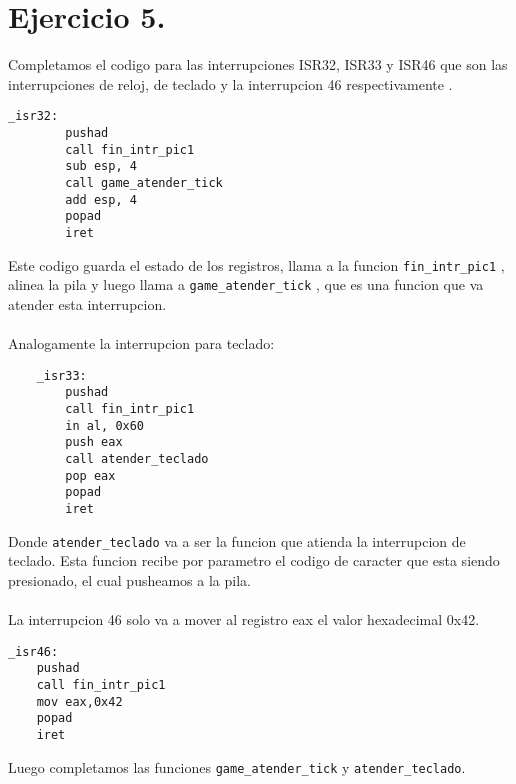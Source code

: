 \section{Ejercicio 5.}

\noindent Completamos el codigo para las interrupciones ISR32, ISR33 y ISR46 que son las interrupciones de reloj, de teclado y la interrupcion 46 respectivamente .


\begin{codesnippet}
\begin{verbatim}
_isr32:
        pushad
        call fin_intr_pic1
        sub esp, 4
        call game_atender_tick
        add esp, 4
        popad  
        iret
		\end{verbatim}
\end{codesnippet}

\noindent Este codigo  guarda el estado de los registros, llama a la funcion \texttt{fin\_intr\_pic1} , alinea la pila y luego llama a \texttt{game\_atender\_tick} , que es una funcion que va atender esta interrupcion.\\
\\
Analogamente la interrupcion para teclado:

\begin{codesnippet}
\begin{verbatim}
    _isr33:
        pushad
        call fin_intr_pic1
        in al, 0x60
        push eax
        call atender_teclado
        pop eax
        popad  
        iret    
    \end{verbatim}
\end{codesnippet}

\noindent Donde \texttt{atender\_teclado} va a ser la funcion que atienda la interrupcion de teclado. Esta funcion recibe por parametro el codigo de caracter que esta siendo presionado, el cual pusheamos a la pila.
\\
\\
La interrupcion 46 solo va a mover al registro eax el valor hexadecimal 0x42.

\begin{codesnippet}
\begin{verbatim}
_isr46:
    pushad
    call fin_intr_pic1
    mov eax,0x42
    popad
    iret    
    \end{verbatim}
\end{codesnippet}

\newpage

\noindent Luego completamos las funciones \texttt{game\_atender\_tick} y \texttt{atender\_teclado}.

